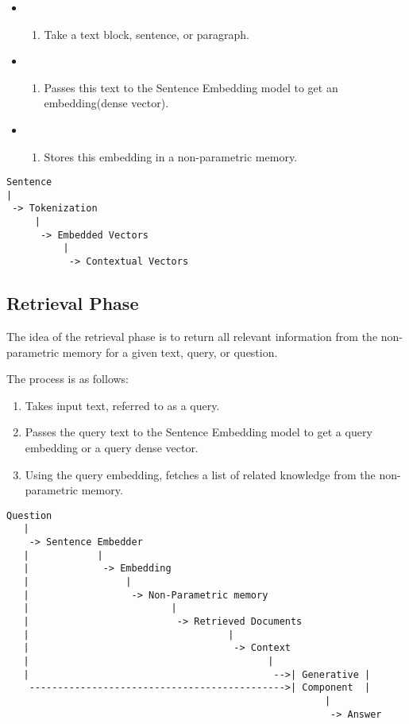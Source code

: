 \documentclass{wseas}
\begin{document}
\begin{itemize}
\item
  \begin{enumerate}
  \def\labelenumi{\arabic{enumi}.}
  \item
    Take a text block, sentence, or paragraph.
  \end{enumerate}
\item
  \begin{enumerate}
  \def\labelenumi{\arabic{enumi}.}
  \setcounter{enumi}{1}
  \item
    Passes this text to the Sentence Embedding model to get an
    embedding(dense vector).
  \end{enumerate}
\item
  \begin{enumerate}
  \def\labelenumi{\arabic{enumi}.}
  \setcounter{enumi}{2}
  \item
    Stores this embedding in a non-parametric memory.
  \end{enumerate}
\end{itemize}

\begin{verbatim}
Sentence
|
 -> Tokenization
     |
      -> Embedded Vectors
          |
           -> Contextual Vectors
\end{verbatim}


\subsection{Retrieval Phase}

The idea of the retrieval phase is to return all relevant information
from the non-parametric memory for a given text, query, or question.

The process is as follows:

\begin{enumerate}
\def\labelenumi{\arabic{enumi}.}
\item
  Takes input text, referred to as a query.
\item
  Passes the query text to the Sentence Embedding model to get a query
  embedding or a query dense vector.
\item
  Using the query embedding, fetches a list of related knowledge from
  the non-parametric memory.
\end{enumerate}

\begin{verbatim}
Question 
   |
    -> Sentence Embedder 
   |            | 
   |             -> Embedding 
   |                 |
   |                  -> Non-Parametric memory 
   |                         |
   |                          -> Retrieved Documents
   |                                   |
   |                                    -> Context
   |                                          | 
   |                                           -->| Generative |
    --------------------------------------------->| Component  |
                                                        |
                                                         -> Answer
\end{verbatim}
\end{document}
